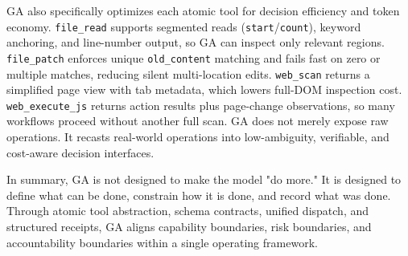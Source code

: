 GA also specifically optimizes each atomic tool for decision efficiency and token economy.  
\texttt{file\_read} supports segmented reads (\texttt{start}/\texttt{count}), keyword anchoring, and line-number output, so GA can inspect only relevant regions.  
\texttt{file\_patch} enforces unique \texttt{old\_content} matching and fails fast on zero or multiple matches, reducing silent multi-location edits.  
\texttt{web\_scan} returns a simplified page view with tab metadata, which lowers full-DOM inspection cost.  
\texttt{web\_execute\_js} returns action results plus page-change observations, so many workflows proceed without another full scan.  
GA does not merely expose raw operations.  
It recasts real-world operations into low-ambiguity, verifiable, and cost-aware decision interfaces.

In summary, GA is not designed to make the model "do more."  
It is designed to define what can be done, constrain how it is done, and record what was done.  
Through atomic tool abstraction, schema contracts, unified dispatch, and structured receipts, GA aligns capability boundaries, risk boundaries, and accountability boundaries within a single operating framework.

